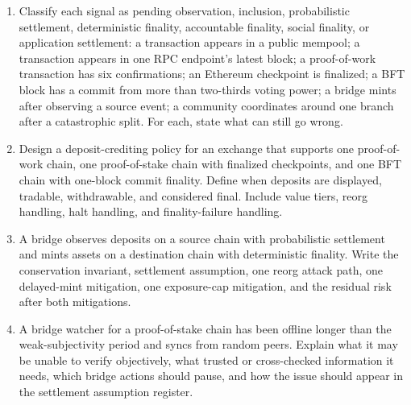 \begin{enumerate}
\item Classify each signal as pending observation, inclusion, probabilistic settlement, deterministic finality, accountable finality, social finality, or application settlement: a transaction appears in a public mempool; a transaction appears in one RPC endpoint's latest block; a proof-of-work transaction has six confirmations; an Ethereum checkpoint is finalized; a BFT block has a commit from more than two-thirds voting power; a bridge mints after observing a source event; a community coordinates around one branch after a catastrophic split. For each, state what can still go wrong.

\item Design a deposit-crediting policy for an exchange that supports one proof-of-work chain, one proof-of-stake chain with finalized checkpoints, and one BFT chain with one-block commit finality. Define when deposits are displayed, tradable, withdrawable, and considered final. Include value tiers, reorg handling, halt handling, and finality-failure handling.

\item A bridge observes deposits on a source chain with probabilistic settlement and mints assets on a destination chain with deterministic finality. Write the conservation invariant, settlement assumption, one reorg attack path, one delayed-mint mitigation, one exposure-cap mitigation, and the residual risk after both mitigations.

\item A bridge watcher for a proof-of-stake chain has been offline longer than the weak-subjectivity period and syncs from random peers. Explain what it may be unable to verify objectively, what trusted or cross-checked information it needs, which bridge actions should pause, and how the issue should appear in the settlement assumption register.
\end{enumerate}
